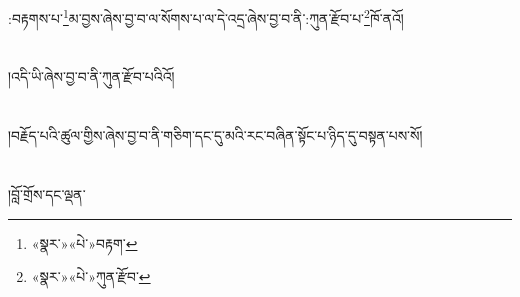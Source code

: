 :བརྟགས་པ་\footnote{«སྣར་»«པེ་»བརྟག་}མ་བྱས་ཞེས་བྱ་བ་ལ་སོགས་པ་ལ་དེ་འདྲ་ཞེས་བྱ་བ་ནི་:ཀུན་རྫོབ་པ་\footnote{«སྣར་»«པེ་»ཀུན་རྫོབ་}ཁོ་ནའོ།\chapter{ }།འདི་ཡི་ཞེས་བྱ་བ་ནི་ཀུན་རྫོབ་པའིའོ།\chapter{ }།བརྗོད་པའི་ཚུལ་གྱིས་ཞེས་བྱ་བ་ནི་གཅིག་དང་དུ་མའི་རང་བཞིན་སྟོང་པ་ཉིད་དུ་བསྟན་པས་སོ།\chapter{ }།བློ་གྲོས་དང་ལྡན་